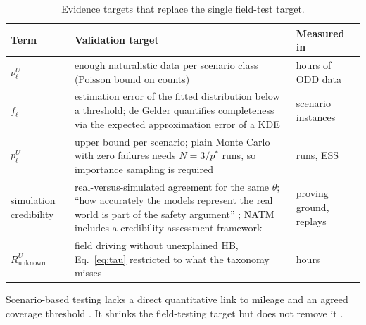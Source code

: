 \documentclass[11pt,a4paper]{article}
\begin{document}
\begin{table}[H]\centering\small
\caption{Evidence targets that replace the single field-test target.}
\label{tab:evidence}
\begin{tabular}{L{2.6cm}L{8.3cm}L{3.4cm}}
\toprule
Term & Validation target & Measured in\\\midrule
$\nu_\ell^U$ & enough naturalistic data per scenario class (Poisson bound on counts) & hours of ODD data\\
$f_\ell$ & estimation error of the fitted distribution below a threshold; de Gelder quantifies completeness via the expected approximation error of a KDE \cite[Ch.~3]{degelder2022} & scenario instances\\
$p_\ell^U$ & upper bound per scenario; plain Monte Carlo with zero failures needs $N=3/p^*$ runs, so importance sampling is required & runs, ESS\\
simulation credibility & real-versus-simulated agreement for the same $\theta$; ``how accurately the models represent the real world is part of the safety argument'' \cite[C.1, p.~125]{iso21448}; NATM includes a credibility assessment framework \cite[web article]{siemensnatm} & proving ground, replays\\
$R^U_{\text{unknown}}$ & field driving without unexplained HB, Eq.~\eqref{eq:tau} restricted to what the taxonomy misses & hours\\
\bottomrule
\end{tabular}
\end{table}
Scenario-based testing lacks a direct quantitative link to mileage and an agreed coverage threshold \cite[Sec.~V, RA ``Scenario Based Testing'', Table~XI]{betschinske2025}. It shrinks the field-testing target but does not remove it \cite[Sec.~VII]{betschinske2025}.
\end{document}
